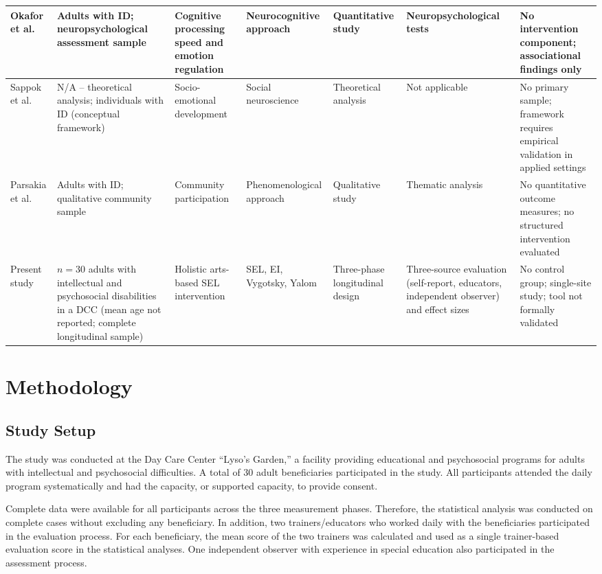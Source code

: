 \documentclass[journal]{IEEEtran}
\begin{document}
{\begin{landscape}
\begin{table}[H]
\begin{tabular}{p{2.8cm} p{3.2cm} p{3.6cm} p{3.2cm} p{3.0cm} p{3.2cm} p{3.8cm}}
\hline
Okafor et al. \cite{okafor2025} & Adults with ID; neuropsychological assessment sample & Cognitive processing speed and emotion regulation & Neurocognitive approach & Quantitative study & Neuropsychological tests & No intervention component; associational findings only \\
\hline
Sappok et al. \cite{sappok2022} & N/A -- theoretical analysis; individuals with ID (conceptual framework) & Socio-emotional development & Social neuroscience & Theoretical analysis & Not applicable & No primary sample; framework requires empirical validation in applied settings \\
\hline
Parsakia et al. \cite{parsakia2024} & Adults with ID; qualitative community sample & Community participation & Phenomenological approach & Qualitative study & Thematic analysis & No quantitative outcome measures; no structured intervention evaluated \\
\hline
Present study & $n=30$ adults with intellectual and psychosocial disabilities in a DCC (mean age not reported; complete longitudinal sample) & Holistic arts-based SEL intervention & SEL, EI, Vygotsky, Yalom & Three-phase longitudinal design & Three-source evaluation (self-report, educators, independent observer) and effect sizes & No control group; single-site study; tool not formally validated \\
\hline
\end{tabular}
\end{table}
\vspace*{\fill}
\end{landscape}
\clearpage
}

\FloatBarrier
\section{Methodology}

\subsection{Study Setup}

The study was conducted at the Day Care Center ``Lyso's Garden,'' a facility providing educational and psychosocial programs for adults with intellectual and psychosocial difficulties. A total of 30 adult beneficiaries participated in the study. All participants attended the daily program systematically and had the capacity, or supported capacity, to provide consent.

Complete data were available for all participants across the three measurement phases. Therefore, the statistical analysis was conducted on complete cases without excluding any beneficiary. In addition, two trainers/educators who worked daily with the beneficiaries participated in the evaluation process. For each beneficiary, the mean score of the two trainers was calculated and used as a single trainer-based evaluation score in the statistical analyses. One independent observer with experience in special education also participated in the assessment process.
\end{document}
